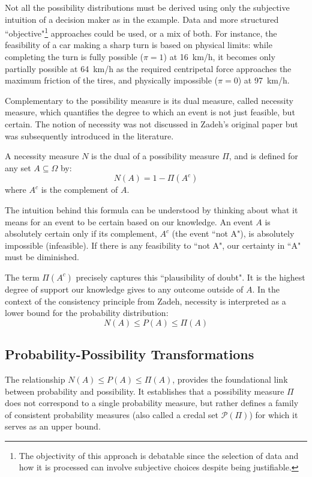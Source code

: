 \begin{remark}
    Not all the possibility distributions must be derived using only the subjective intuition of a decision maker as in the example. Data and more structured ``objective"\footnote{The objectivity of this approach is debatable since the selection of data and how it is processed can involve subjective choices despite being justifiable.} approaches could be used, or a mix of both. 
    For instance, the feasibility of a car making a sharp turn is based on physical limits: while completing the turn is fully possible ($\pi=1$) at 16~km/h, it becomes only partially possible at 64~km/h as the required centripetal force approaches the maximum friction of the tires, and physically impossible ($\pi=0$) at 97~km/h.
\end{remark}

Complementary to the possibility measure is its dual measure, called necessity measure, which quantifies the degree to which an event is not just feasible, but certain. The notion of necessity was not discussed in Zadeh's original paper but was subsequently introduced in the literature.

\begin{definition}
A necessity measure $N$ is the dual of a possibility measure $\Pi$, and is defined for any set $A \subseteq \Omega$ by:
\[ N(A) = 1 - \Pi(A^c) \]
where $A^c$ is the complement of $A$.
\end{definition}

The intuition behind this formula can be understood by thinking about what it means for an event to be certain based on our knowledge. An event $A$ is absolutely certain only if its complement, $A^c$ (the event ``not A"), is absolutely impossible (infeasible). If there is any feasibility to ``not A", our certainty in ``A" must be diminished.

The term $\Pi(A^c)$ precisely captures this ``plausibility of doubt". It is the highest degree of support our knowledge gives to any outcome outside of $A$. In the context of the consistency principle from Zadeh, necessity is interpreted as a lower bound for the probability distribution:
\[N(A) \le P(A) \le \Pi(A)\]

\subsection{Probability-Possibility Transformations}



The relationship $N(A) \le P(A) \le \Pi(A)$, provides the foundational link between probability and possibility. It establishes that a possibility measure $\Pi$ does not correspond to a single probability measure, but rather defines a family of consistent probability measures (also called a credal set $\mathcal{P}(\Pi)$) for which it serves as an upper bound.

